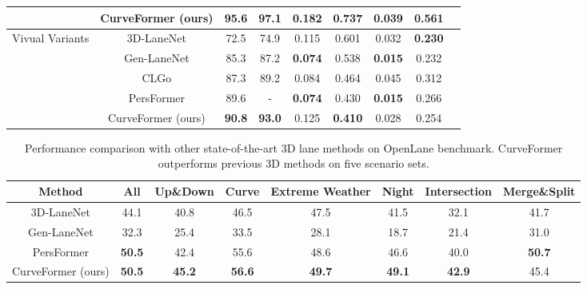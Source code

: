 \documentclass[letterpaper, 10 pt, conference]{ieeeconf}
\begin{document}
\begin{table*}[t]
\begin{scriptsize}
\begin{tabular}{c|c|ccccccc}
      & CurveFormer (ours)         & \textbf{95.6} & \textbf{97.1} & 0.182 & 0.737 & 0.039 & 0.561 &  \\
      \midrule
      \multicolumn{1}{c|}{\multirow{5}{5em}{Vivual Variants}} 
      & 3D-LaneNet\cite{garnett20193d}   & 72.5 & 74.9 & 0.115 & 0.601 & 0.032 & \textbf{0.230} \\
      & Gen-LaneNet\cite{guo2020gen}  & 85.3 & 87.2 & \textbf{0.074} & 0.538 & \textbf{0.015} & 0.232 \\
      & CLGo\cite{liu2022learning}         & 87.3 & 89.2 & 0.084 & 0.464 & 0.045 & 0.312 \\
      & PersFormer\cite{chen2022persformer}   & 89.6 & - & \textbf{0.074} & 0.430 & \textbf{0.015} & 0.266 \\
      & CurveFormer (ours)         & \textbf{90.8} & \textbf{93.0} & 0.125 & \textbf{0.410} & 0.028 & 0.254 &  \\
      \bottomrule
    \end{tabular}
\end{scriptsize}
\end{table*}


\begin{table*}[t]
  \begin{center}
  \begin{scriptsize}
    \caption{Performance comparison with other state-of-the-art 3D lane methods on OpenLane benchmark. CurveFormer outperforms previous 3D methods on five scenario sets.}
    \label{tab:results-openlane-scenario-set}
    \begin{tabular}{cccccccc}
    \toprule
      Method & All & Up\&Down & Curve & Extreme Weather & Night & Intersection & Merge\&Split \\
      \midrule
      3D-LaneNet\cite{garnett20193d} & 44.1 & 40.8 & 46.5 & 47.5 & 41.5 & 32.1 & 41.7 \\
      Gen-LaneNet\cite{guo2020gen} & 32.3 & 25.4 & 33.5 & 28.1 & 18.7 & 21.4 & 31.0 \\
      PersFormer\cite{chen2022persformer} & \textbf{50.5} & 42.4 & 55.6 & 48.6 & 46.6 & 40.0 & \textbf{50.7} \\
      CurveFormer (ours) & \textbf{50.5} & \textbf{45.2} & \textbf{56.6} & \textbf{49.7} & \textbf{49.1} & \textbf{42.9} & 45.4\\
      \bottomrule
    \end{tabular}
      \end{scriptsize}
  \end{center}
\end{table*}
\end{document}
